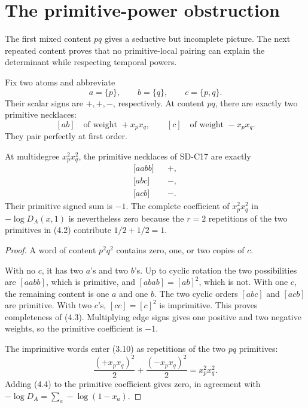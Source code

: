 \section{The primitive-power obstruction}
\label{sec:power}

The first mixed content $pq$ gives a seductive but incomplete picture.  The
next repeated content proves that no primitive-local pairing can explain the
determinant while respecting temporal powers.

Fix two atoms and abbreviate
\[
  a=\{p\},\qquad b=\{q\},\qquad c=\{p,q\}.
  \tag{4.1}
\]
Their scalar signs are $+,+,-$, respectively.  At content $pq$, there are
exactly two primitive necklaces:
\[
  [ab]\quad\text{of weight }+x_px_q,
  \qquad
  [c]\quad\text{of weight }-x_px_q.
  \tag{4.2}
\]
They pair perfectly at first order.

\begin{theorem}
\label{thm:p2q2}
At multidegree $x_p^2x_q^2$, the primitive necklaces of SD-C17 are exactly
\[
\begin{array}{ccl}
  \lbrack aabb\rbrack && +,\\
  \lbrack abc\rbrack  && -,\\
  \lbrack acb\rbrack  && -.
\end{array}
\tag{4.3}
\]
Their primitive signed sum is $-1$.  The complete coefficient of
$x_p^2x_q^2$ in $-\log D_A(x,1)$ is nevertheless zero because the $r=2$
repetitions of the two primitives in (4.2) contribute $1/2+1/2=1$.
\end{theorem}

\begin{proof}
A word of content $p^2q^2$ contains zero, one, or two copies of $c$.

With no $c$, it has two $a$'s and two $b$'s.  Up to cyclic rotation the two
possibilities are $[aabb]$, which is primitive, and
$[abab]=[ab]^2$, which is not.  With one $c$, the remaining content is one
$a$ and one $b$.  The two cyclic orders $[abc]$ and $[acb]$ are primitive.
With two $c$'s, $[cc]=[c]^2$ is imprimitive.  This proves completeness of
(4.3).  Multiplying edge signs gives one positive and two negative weights,
so the primitive coefficient is $-1$.

The imprimitive words enter (3.10) as repetitions of the two $pq$ primitives:
\[
  \frac{(+x_px_q)^2}{2}
  +\frac{(-x_px_q)^2}{2}
  =x_p^2x_q^2.
  \tag{4.4}
\]
Adding (4.4) to the primitive coefficient gives zero, in agreement with
$-\log D_A=\sum_a-\log(1-x_a)$.
\end{proof}

